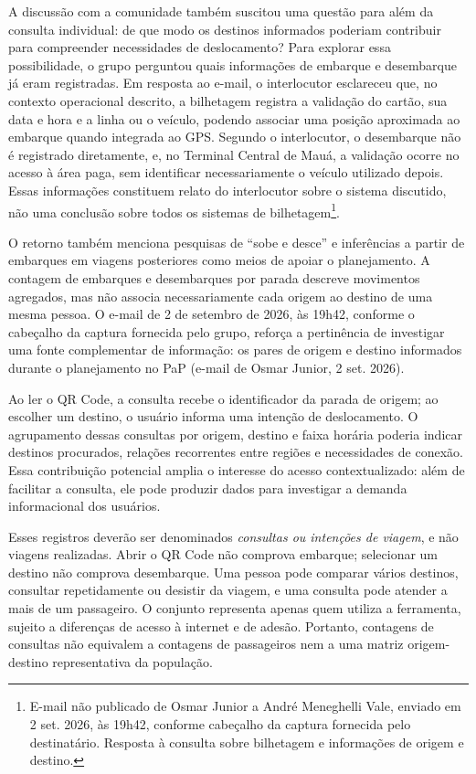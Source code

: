 \documentclass[12pt,oneside,a4paper,brazil,chapter=TITLE]{abntex2}
\begin{document}
A discussão com a comunidade também suscitou uma questão para além da consulta individual: de que modo os destinos informados poderiam contribuir para compreender necessidades de deslocamento? Para explorar essa possibilidade, o grupo perguntou quais informações de embarque e desembarque já eram registradas. Em resposta ao e-mail, o interlocutor esclareceu que, no contexto operacional descrito, a bilhetagem registra a validação do cartão, sua data e hora e a linha ou o veículo, podendo associar uma posição aproximada ao embarque quando integrada ao GPS. Segundo o interlocutor, o desembarque não é registrado diretamente, e, no Terminal Central de Mauá, a validação ocorre no acesso à área paga, sem identificar necessariamente o veículo utilizado depois. Essas informações constituem relato do interlocutor sobre o sistema discutido, não uma conclusão sobre todos os sistemas de bilhetagem\footnote{E-mail não publicado de Osmar Junior a André Meneghelli Vale, enviado em 2 set. 2026, às 19h42, conforme cabeçalho da captura fornecida pelo destinatário. Resposta à consulta sobre bilhetagem e informações de origem e destino.}.

O retorno também menciona pesquisas de ``sobe e desce'' e inferências a partir de embarques em viagens posteriores como meios de apoiar o planejamento. A contagem de embarques e desembarques por parada descreve movimentos agregados, mas não associa necessariamente cada origem ao destino de uma mesma pessoa. O e-mail de 2 de setembro de 2026, às 19h42, conforme o cabeçalho da captura fornecida pelo grupo, reforça a pertinência de investigar uma fonte complementar de informação: os pares de origem e destino informados durante o planejamento no PaP (e-mail de Osmar Junior, 2 set. 2026).

Ao ler o QR Code, a consulta recebe o identificador da parada de origem; ao escolher um destino, o usuário informa uma intenção de deslocamento. O agrupamento dessas consultas por origem, destino e faixa horária poderia indicar destinos procurados, relações recorrentes entre regiões e necessidades de conexão. Essa contribuição potencial amplia o interesse do acesso contextualizado: além de facilitar a consulta, ele pode produzir dados para investigar a demanda informacional dos usuários.

Esses registros deverão ser denominados \textit{consultas ou intenções de viagem}, e não viagens realizadas. Abrir o QR Code não comprova embarque; selecionar um destino não comprova desembarque. Uma pessoa pode comparar vários destinos, consultar repetidamente ou desistir da viagem, e uma consulta pode atender a mais de um passageiro. O conjunto representa apenas quem utiliza a ferramenta, sujeito a diferenças de acesso à internet e de adesão. Portanto, contagens de consultas não equivalem a contagens de passageiros nem a uma matriz origem-destino representativa da população.
\end{document}

